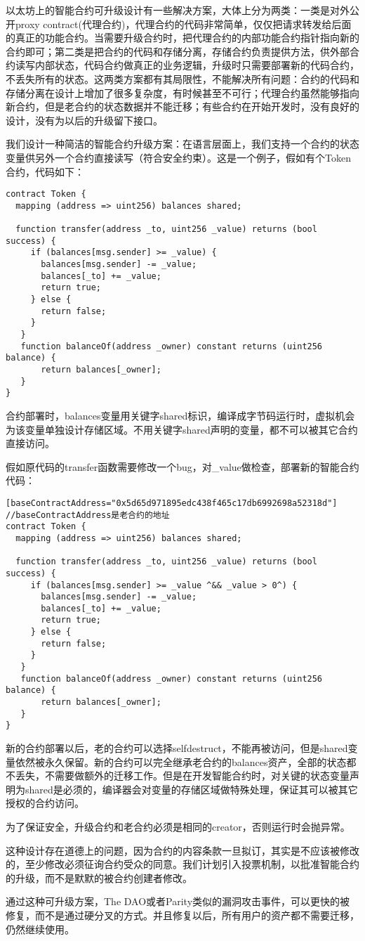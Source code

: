 以太坊上的智能合约可升级设计有一些解决方案，大体上分为两类：一类是对外公开proxy contract(代理合约)，代理合约的代码非常简单，仅仅把请求转发给后面的真正的功能合约。当需要升级合约时，把代理合约的内部功能合约指针指向新的合约即可；第二类是把合约的代码和存储分离，存储合约负责提供方法，供外部合约读写内部状态，代码合约做真正的业务逻辑，升级时只需要部署新的代码合约，不丢失所有的状态。这两类方案都有其局限性，不能解决所有问题：合约的代码和存储分离在设计上增加了很多复杂度，有时候甚至不可行；代理合约虽然能够指向新合约，但是老合约的状态数据并不能迁移；有些合约在开始开发时，没有良好的设计，没有为以后的升级留下接口。

我们设计一种简洁的智能合约升级方案：在语言层面上，我们支持一个合约的状态变量供另外一个合约直接读写（符合安全约束）。这是一个例子，假如有个Token合约，代码如下：
\begin{lstlisting}[frame=single]
contract Token {
  mapping (address => uint256) balances shared;

  function transfer(address _to, uint256 _value) returns (bool success) {
     if (balances[msg.sender] >= _value) {
       balances[msg.sender] -= _value;
       balances[_to] += _value;
       return true;
     } else {
       return false;
     }
   }
   function balanceOf(address _owner) constant returns (uint256 balance) {
       return balances[_owner];
   }
}
\end{lstlisting}

合约部署时，balances变量用关键字shared标识，编译成字节码运行时，虚拟机会为该变量单独设计存储区域。不用关键字shared声明的变量，都不可以被其它合约直接访问。

假如原代码的transfer函数需要修改一个bug，对\_value做检查，部署新的智能合约代码：

\begin{lstlisting}[frame=single]
[baseContractAddress="0x5d65d971895edc438f465c17db6992698a52318d"]
//baseContractAddress是老合约的地址
contract Token {
  mapping (address => uint256) balances shared;

  function transfer(address _to, uint256 _value) returns (bool success) {
     if (balances[msg.sender] >= _value ^&& _value > 0^) {
       balances[msg.sender] -= _value;
       balances[_to] += _value;
       return true;
     } else {
       return false;
     }
   }
   function balanceOf(address _owner) constant returns (uint256 balance) {
       return balances[_owner];
   }
}
\end{lstlisting}

新的合约部署以后，老的合约可以选择selfdestruct，不能再被访问，但是shared变量依然被永久保留。新的合约可以完全继承老合约的balances资产，全部的状态都不丢失，不需要做额外的迁移工作。但是在开发智能合约时，对关键的状态变量声明为shared是必须的，编译器会对变量的存储区域做特殊处理，保证其可以被其它授权的合约访问。

为了保证安全，升级合约和老合约必须是相同的creator，否则运行时会抛异常。

这种设计存在道德上的问题，因为合约的内容条款一旦拟订，其实是不应该被修改的，至少修改必须征询合约受众的同意。我们计划引入投票机制，以批准智能合约的升级，而不是默默的被合约创建者修改。

通过这种可升级方案，The DAO或者Parity类似的漏洞攻击事件，可以更快的被修复，而不是通过硬分叉的方式。并且修复以后，所有用户的资产都不需要迁移，仍然继续使用。


